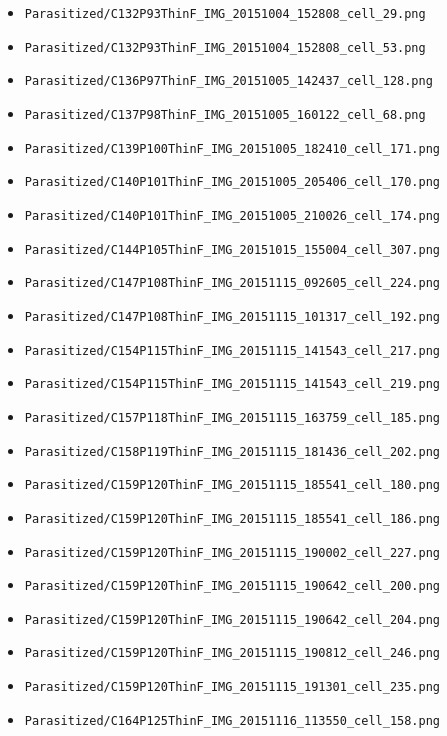 \begin{itemize}
\item \texttt{Parasitized/C132P93ThinF\_IMG\_20151004\_152808\_cell\_29.png}
\item \texttt{Parasitized/C132P93ThinF\_IMG\_20151004\_152808\_cell\_53.png}
\item \texttt{Parasitized/C136P97ThinF\_IMG\_20151005\_142437\_cell\_128.png}
\item \texttt{Parasitized/C137P98ThinF\_IMG\_20151005\_160122\_cell\_68.png}
\item \texttt{Parasitized/C139P100ThinF\_IMG\_20151005\_182410\_cell\_171.png}
\item \texttt{Parasitized/C140P101ThinF\_IMG\_20151005\_205406\_cell\_170.png}
\item \texttt{Parasitized/C140P101ThinF\_IMG\_20151005\_210026\_cell\_174.png}
\item \texttt{Parasitized/C144P105ThinF\_IMG\_20151015\_155004\_cell\_307.png}
\item \texttt{Parasitized/C147P108ThinF\_IMG\_20151115\_092605\_cell\_224.png}
\item \texttt{Parasitized/C147P108ThinF\_IMG\_20151115\_101317\_cell\_192.png}
\item \texttt{Parasitized/C154P115ThinF\_IMG\_20151115\_141543\_cell\_217.png}
\item \texttt{Parasitized/C154P115ThinF\_IMG\_20151115\_141543\_cell\_219.png}
\item \texttt{Parasitized/C157P118ThinF\_IMG\_20151115\_163759\_cell\_185.png}
\item \texttt{Parasitized/C158P119ThinF\_IMG\_20151115\_181436\_cell\_202.png}
\item \texttt{Parasitized/C159P120ThinF\_IMG\_20151115\_185541\_cell\_180.png}
\item \texttt{Parasitized/C159P120ThinF\_IMG\_20151115\_185541\_cell\_186.png}
\item \texttt{Parasitized/C159P120ThinF\_IMG\_20151115\_190002\_cell\_227.png}
\item \texttt{Parasitized/C159P120ThinF\_IMG\_20151115\_190642\_cell\_200.png}
\item \texttt{Parasitized/C159P120ThinF\_IMG\_20151115\_190642\_cell\_204.png}
\item \texttt{Parasitized/C159P120ThinF\_IMG\_20151115\_190812\_cell\_246.png}
\item \texttt{Parasitized/C159P120ThinF\_IMG\_20151115\_191301\_cell\_235.png}
\item \texttt{Parasitized/C164P125ThinF\_IMG\_20151116\_113550\_cell\_158.png}

\end{itemize}
